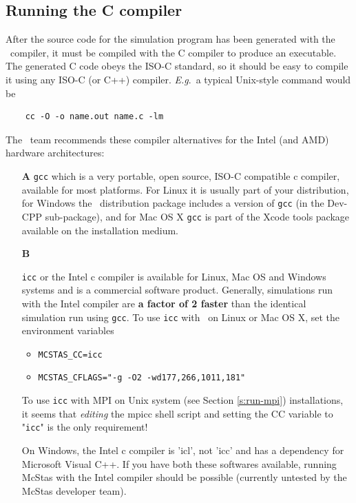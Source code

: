 \subsection{Running the C compiler}
\label{s:compile}

After the source code for the simulation program has been generated with
the \MCS\ compiler, it must be compiled with the C compiler to produce
an executable. The generated C code obeys the ISO-C standard, so it
should be easy to compile it using any ISO-C (or C++) compiler. \textit{E.g}.\ a
typical Unix-style command would be
\begin{verbatim}
    cc -O -o name.out name.c -lm
\end{verbatim}
The \MCS\ team recommends these compiler alternatives for the Intel
(and AMD) hardware architectures:
\begin{itemize}
\item[\bf A]{\verb+gcc+ which is a very portable, open source, ISO-C
    compatible c compiler, available for most platforms. For Linux it
    is usually part of your distribution, for Windows the \MCS\
    distribution package includes a version of \verb+gcc+
    (in the Dev-CPP sub-package), and for Mac OS X \verb+gcc+ is part
    of the Xcode tools package available on the installation medium.}
\item[\bf B]{\verb+icc+ or the Intel c compiler is available for Linux, Mac
    OS and Windows systems and is a commercial software
    product. Generally, simulations run with the Intel compiler are
    {\bf a factor of 2 faster} than the identical simulation run using \verb+gcc+. To use \verb+icc+ with \MCS\ on Linux or Mac OS X, set the environment variables
    \begin{itemize}
      \item{\verb+MCSTAS_CC=icc+}
      \item{\verb+MCSTAS_CFLAGS="-g -O2 -wd177,266,1011,181"+}
    \end{itemize}
    To use \verb+icc+ with MPI on Unix system (see Section \ref{s:run-mpi})
 installations, it seems that \emph{editing}
    the mpicc shell script and setting the CC variable to "\verb+icc+" is the
    only requirement!}
    On Windows, the Intel c compiler is 'icl', not 'icc' and has a dependency for Microsoft Visual C++. If you have both these softwares available, running McStas with the Intel compiler should be possible (currently untested by the McStas developer team).

\end{itemize}


